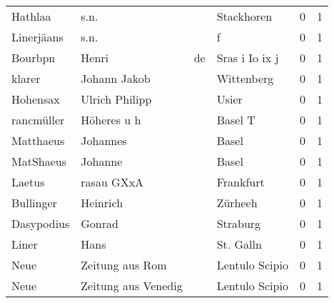 \begin{center}
\begin{tiny}
\begin{longtabu}{llllrr}
                  Hathlaa &                               s.n. &             &                                  Stackhoren &          0 &         1 \\
               Linerjäans &                               s.n. &             &                                           f &          0 &         1 \\
                  Bourbpn &                              Henri &          de &                              Sras i Io ix j &          0 &         1 \\
                   klarer &                       Johann Jakob &             &                                  Wittenberg &          0 &         1 \\
                 Hohensax &                     Ulrich Philipp &             &                                       Usier &          0 &         1 \\
               rancmüller &                        Höheres u h &             &                                     Basel T &          0 &         1 \\
                Matthaeus &                           Johannes &             &                                       Basel &          0 &         1 \\
                MatShaeus &                            Johanne &             &                                       Basel &          0 &         1 \\
                   Laetus &                         rasau GXxA &             &                                   Frankfurt &          0 &         1 \\
                Bullinger &                           Heinrich &             &                                     Zürheeh &          0 &         1 \\
               Dasypodius &                             Gonrad &             &                                    Straburg &          0 &         1 \\
                    Liner &                               Hans &             &                                   St. Galln &          0 &         1 \\
                     Neue &                    Zeitung aus Rom &             &                              Lentulo Scipio &          0 &         1 \\
                     Neue &                Zeitung aus Venedig &             &                              Lentulo Scipio &          0 &         1 \\

\end{longtabu}
\end{tiny}
\end{center}
